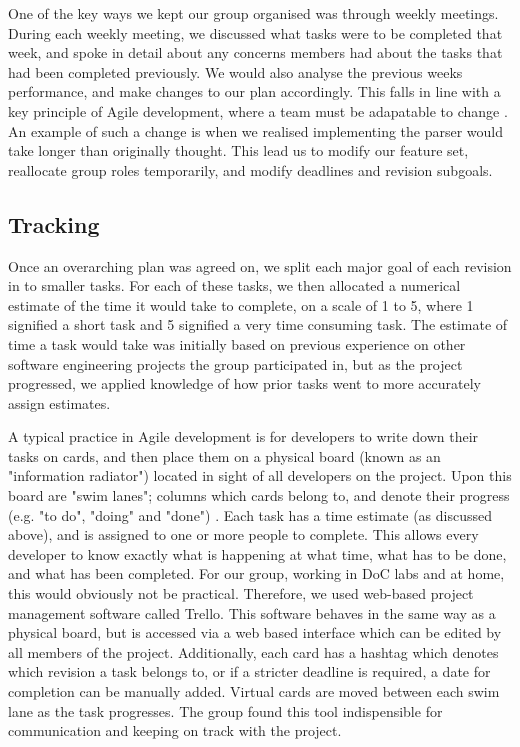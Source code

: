 \documentclass[a4paper, 11pt]{article}
\begin{document}
    One of the key ways we kept our group organised was through weekly
    meetings.  During each weekly meeting, we discussed what tasks were to be
    completed that week, and spoke in detail about any concerns members had
    about the tasks that had been completed previously. We would also analyse
    the previous weeks performance, and make changes to our plan accordingly.
    This falls in line with a key principle of Agile development, where a team
    must be adapatable to change \cite{agilemanifesto}. 
    An example of such a change is when we realised implementing the parser 
    would take longer than originally thought. This lead us to modify our 
    feature set, reallocate group roles temporarily, and modify deadlines 
    and revision subgoals.

  \subsection{Tracking}
    Once an overarching plan was agreed on, we split each major goal of each
    revision in to smaller tasks. For each of these tasks, we then allocated a
    numerical estimate of the time it would take to complete, on a scale of 1
    to 5, where 1 signified a short task and 5 signified a very time consuming
    task. The estimate of time a task would take was initially based on
    previous experience on other software engineering projects the group
    participated in, but as the project progressed, we applied knowledge of how
    prior tasks went to more accurately assign estimates.

    A typical practice in Agile development is for developers to write down
    their tasks on cards, and then place them on a physical board (known as an
    "information radiator") located in sight of all developers on the project.
    Upon this board are "swim lanes"; columns which cards belong to, and denote
    their progress (e.g. "to do", "doing" and "done") \cite{agileswimlane}. 
    Each task has a time
    estimate (as discussed above), and is assigned to one or more people to
    complete.  This allows every developer to know exactly what is happening at
    what time, what has to be done, and what has been completed. For our group,
    working in DoC labs and at home, this would obviously not be practical.
    Therefore, we used web-based project management software called
    Trello\cite{trello}. This software behaves in the same way as a physical board, but is
    accessed via a web based interface which can be edited by all members of
    the project.  Additionally, each card has a hashtag which denotes which
    revision a task belongs to, or if a stricter deadline is required, a date
    for completion can be manually added.  Virtual cards are moved between each
    swim lane as the task progresses. The group found this tool indispensible
    for communication and keeping on track with the project.
\end{document}
